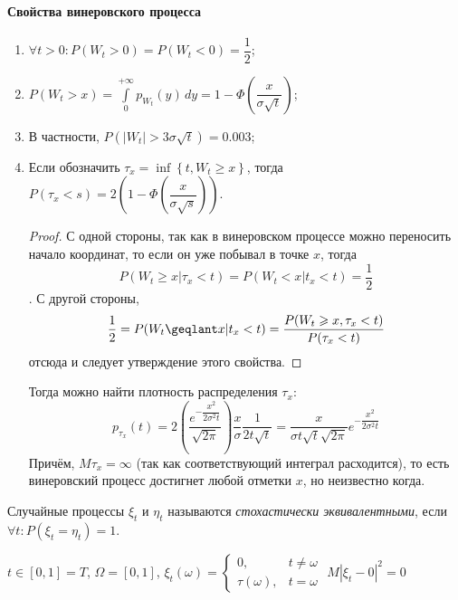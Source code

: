 \paragraph{Свойства винеровского процесса}
\begin{enumerate}
  \item $\forall t > 0 : P(W_t > 0) = P(W_t < 0) = \dfrac{1}{2}$;
  \item $P(W_t > x) = \int\limits_0^{+\infty} p_{W_t}(y) \, dy = 1 - \Phi \left( \dfrac{x}{\sigma\sqrt{t}} \right) $;
  \item В частности, $P( | W_t | > 3\sigma\sqrt{t} ) = 0.003$;
  \item Если обозначить $\tau_x = \inf \left\{ t, W_t \geqslant x \right\} $,
    тогда $P(\tau_x < s) = 2 \left( 1 - \Phi \left( \dfrac{x}{\sigma \sqrt{s}} \right)  \right) $.
    \begin{proof}
      С одной стороны, так как в винеровском процессе можно переносить начало координат,
      то если он уже побывал в точке $x$, тогда
      \[
        P(W_t \geqslant x | \tau_x < t) = P(W_t < x | t_x < t) = \dfrac{1}{2}
      \]
      .
      С другой стороны, 
      \[
        \dfrac{1}{2} = P(W_t \geqlant x | t_x < t) = \dfrac{P(W_t \geqslant x, \tau_x < t)}{P(\tau_x < t)}
      \]
      отсюда и следует утверждение этого свойства.
    \end{proof}
    Тогда можно найти плотность распределения $\tau_x$:
    \[
      p_{\tau_x} ( t) = 2 \left( \dfrac{e^{- \dfrac{x^2}{2\sigma^2 t}}}{\sqrt{2\pi}} \right) \dfrac{x}{\sigma} \dfrac{1}{2 t \sqrt{t}}
      = \dfrac{x}{\sigma t \sqrt{t} \sqrt{2\pi}} e^{-\dfrac{x^2}{2\sigma^2 t}}
    \]
    Причём, $M\tau_x = \infty$ (так как соответствующий интеграл расходится),
    то есть винеровский процесс достигнет любой отметки $x$, но неизвестно когда.
\end{enumerate}


\begin{definition}
  Случайные процессы $\xi_t$ и $\eta_t$ называются \emph{стохастически эквивалентными}, если
  $\forall t : P(\xi_t = \eta_t) = 1$.
\end{definition}

\begin{ex}
  $t \in [0, 1] = T$, $\Omega = [0, 1]$, $\xi_t (\omega) = \begin{cases}
    0, &t \neq \omega \\
    \tau(\omega), &t = \omega
  \end{cases}$
  $M|\xi_t - 0|^2 = 0$
\end{ex}


